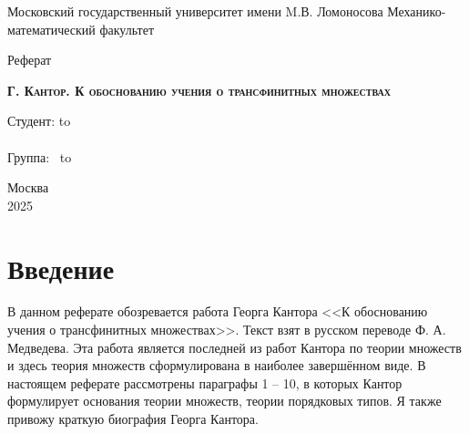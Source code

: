 \documentclass[a4paper,12pt]{extarticle}
\author{Борисенков Никита}
\theoremstyle{definition}
\begin{document}
\begin{titlepage}
    \newpage
    \begin{center}
        Московский государственный университет имени M.В. Ломоносова
        Механико-математический факультет\\
    \end{center}

    \vspace{8em}

    \begin{center}
        \Large Реферат\\
    \end{center}

    \vspace{2em}

    \begin{center}
        \textsc{\textbf{Г. Кантор. К обоснованию учения о трансфинитных множествах}}
    \end{center}

    \vspace{20em}



    \newbox{\lbox}
    \newlength{\maxl}
    \setlength{\maxl}{\wd\lbox}
    \hfill\parbox{13cm}{
        \hspace*{5cm}\hspace*{-5cm}Студент: \qquad\qquad\hbox to \\
        \\
        \hspace*{5cm}\hspace*{-5cm}Группа:\qquad\qquad $\;\:$ \hbox to\\
    }


    \vspace{\fill}

    \begin{center}
        Москва \\2025
    \end{center}

\end{titlepage}
\newpage
\tableofcontents
\newpage
\section{Введение}
В данном реферате обозревается работа Георга Кантора <<К обоснованию учения о трансфинитных множествах>>\cite{orig}.
Текст взят в русском переводе Ф. А. Медведева\cite{used}.
Эта работа является последней из работ Кантора по теории множеств и здесь теория множеств сформулирована в наиболее завершённом виде.
В настоящем реферате рассмотрены параграфы 1 -- 10, в которых Кантор формулирует основания теории множеств, теории порядковых типов.
Я также привожу краткую биография Георга Кантора.
\end{document}
